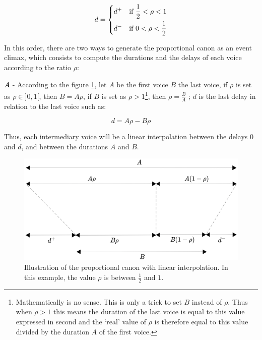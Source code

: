 \[
d=
\begin{dcases}
	 d^+ & \text{if }  \frac{1}{2} < \rho < 1\\
	d^- & \text{if }   0 < \rho < \frac{1}{2} 
   \end{dcases}
\]
 
 \bigskip
 
  In this order, there are two ways to generate the proportional canon as an event climax, which consists to compute the durations and the delays of each voice according to the ratio $\rho$:
   
\bigskip

\textbf{\textit{A}} - 
According to the figure \ref{canon1}, let $A$ be the first voice $B$ the last voice, if $\rho$ is set as $\rho \in ]0,1[$, then $B=A\rho$, if $B$ is set as $\rho > 1$\footnote{Mathematically is no sense. This is only a trick to set $B$ instead of $\rho$. Thus when $\rho>1$ this means the duration of the last voice is equal to this value expressed in second and the `real' value of $\rho$ is therefore equal to this value divided by the duration $A$ of the first voice.}, then $\rho=\frac{B}{A}$ ; $d$ is the last delay in relation to the last voice such as:
  
\[
d=A\rho-B\rho 
\]

  \noindent Thus, each intermediary voice will be a linear interpolation between the delays $0$ and $d$, and between the durations $A$ and $B$.
  
  
\begin{figure}[h]
\begin{center}
\includegraphics[scale=0.8]{img/3499}
\caption{Illustration of the proportional canon with linear interpolation. In this example, the value $\rho$ is between $\frac{1}{2}$ and $1$. 
}
\label{canon1}
\end{center}
\end{figure}

